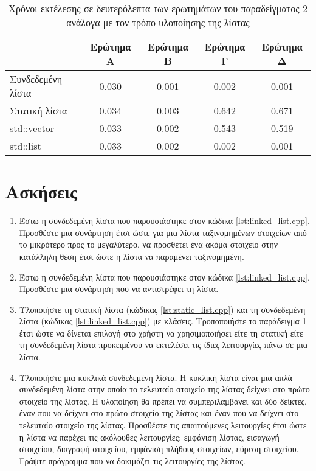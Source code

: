 \begin{table}[!htb]
\centering
\begin{tabular}{|l|c|c|c|c|}
\hline
            & Ερώτημα A     & Ερώτημα B     & Ερώτημα Γ     & Ερώτημα Δ     \\ \hline
Συνδεδεμένη  λίστα & 0.030 & 0.001 & 0.002 & 0.001 \\ \hline
Στατική λίστα  & 0.034 & 0.003 & 0.642 & 0.671 \\ \hline
std::vector     & 0.033 & 0.002 & 0.543 & 0.519 \\ \hline
std::list      & 0.033 & 0.002 & 0.002 & 0.001 \\ \hline
\end{tabular}
\caption{Χρόνοι εκτέλεσης σε δευτερόλεπτα των ερωτημάτων του παραδείγματος 2 ανάλογα με τον τρόπο υλοποίησης της λίστας}
\label{tbl:lists}
\end{table}



\section{Ασκήσεις}
\begin{enumerate}
\item Έστω η συνδεδεμένη λίστα που παρουσιάστηκε στον κώδικα \ref{lst:linked_list.cpp}. Προσθέστε μια συνάρτηση έτσι ώστε για  μια λίστα ταξινομημένων στοιχείων από το μικρότερο προς το μεγαλύτερο, να προσθέτει ένα ακόμα στοιχείο στην κατάλληλη θέση έτσι ώστε η λίστα να παραμένει ταξινομημένη.
\item Έστω η συνδεδεμένη λίστα που παρουσιάστηκε στον κώδικα \ref{lst:linked_list.cpp}. Προσθέστε μια συνάρτηση που να αντιστρέφει τη λίστα.
\item Υλοποιήστε τη στατική λίστα (κώδικας \ref{lst:static_list.cpp}) και τη συνδεδεμένη λίστα (κώδικας \ref{lst:linked_list.cpp}) με κλάσεις. Τροποποιήστε το παράδειγμα 1 έτσι ώστε να δίνεται επιλογή στο χρήστη να χρησιμοποιήσει είτε τη στατική είτε τη συνδεδεμένη λίστα προκειμένου να εκτελέσει τις ίδιες λειτουργίες πάνω σε μια λίστα. 
\item Υλοποιήστε μια κυκλικά συνδεδεμένη λίστα. Η κυκλική λίστα είναι μια απλά συνδεδεμένη λίστα στην οποία το τελευταίο στοιχείο της λίστας δείχνει στο πρώτο στοιχείο της λίστας. Η υλοποίηση θα πρέπει να συμπεριλαμβάνει και δύο δείκτες, έναν που να δείχνει στο πρώτο στοιχείο της λίστας και έναν που να δείχνει στο τελευταίο στοιχείο της λίστας. Προσθέστε τις απαιτούμενες λειτουργίες έτσι ώστε η λίστα να παρέχει τις ακόλουθες λειτουργίες: εμφάνιση λίστας, εισαγωγή στοιχείου, διαγραφή στοιχείου, εμφάνιση πλήθους στοιχείων, εύρεση στοιχείου. Γράψτε πρόγραμμα που να δοκιμάζει τις λειτουργίες της λίστας.
\end{enumerate}

